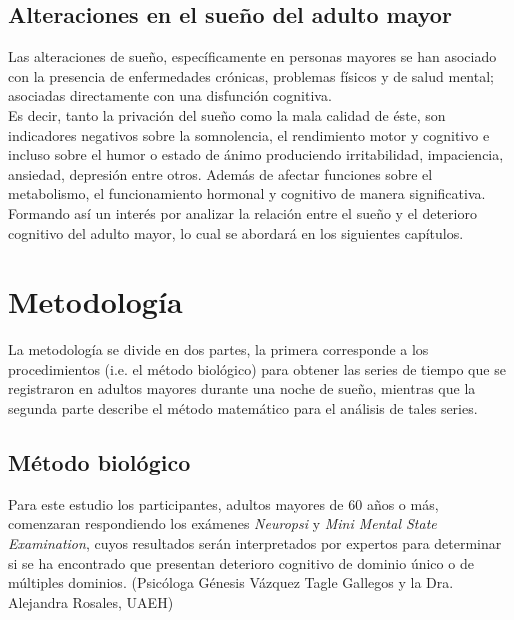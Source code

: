 \documentclass[letterpaper,titlepage,12pt,draft]{report}
\begin{document}
\section{Alteraciones en el sue\~no del adulto mayor}

Las alteraciones de sue\~no, espec\'ificamente en personas mayores se han asociado con la presencia de enfermedades cr\'onicas, problemas f\'isicos y de salud mental; asociadas directamente con una disfunci\'on cognitiva.\\

Es decir, tanto la privaci\'on del sue\~no como la mala calidad de \'este, son indicadores negativos sobre la somnolencia, el rendimiento motor y cognitivo e incluso sobre el humor o estado de \'animo produciendo irritabilidad, impaciencia, ansiedad, depresi\'on entre otros. Adem\'as de afectar funciones sobre el metabolismo, el funcionamiento hormonal y cognitivo de manera significativa.\\

Formando as\'i un inter\'es por analizar la relaci\'on entre el sue\~no y el deterioro cognitivo del adulto mayor, lo cual se abordar\'a en los siguientes cap\'itulos.


\newpage
\chapter{Metodolog\'ia}

La metodolog\'ia se divide en dos partes, la primera corresponde a los procedimientos (i.e. el m\'etodo biol\'ogico) para obtener las series de tiempo que se registraron en adultos mayores durante una noche de sue\~no, mientras que la segunda parte describe el m\'etodo matem\'atico para el an\'alisis de tales series.


\section{M\'etodo biol\'ogico}

Para este estudio los participantes, adultos mayores de 60 a\~nos o m\'as, comenzaran respondiendo los ex\'amenes \textit{Neuropsi} y \textit{Mini Mental State Examination}, cuyos resultados ser\'an interpretados por expertos para determinar si se ha encontrado que presentan deterioro cognitivo de dominio \'unico o de m\'ultiples dominios. (Psic\'ologa G\'enesis V\'azquez Tagle Gallegos y la Dra. Alejandra Rosales, UAEH) \\
\end{document}
